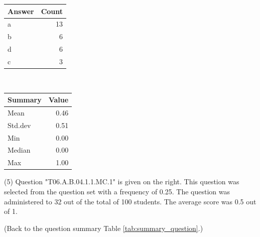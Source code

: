 \documentclass[12pt,nohyper]{tufte-handout}\usepackage[]{graphicx}\usepackage[]{color}
\begin{document}
\begin{center}%
\begin{tabular}{lr}
  \hline
Answer & Count \\ 
  \hline
a &  13 \\ 
  b &   6 \\ 
  d &   6 \\ 
  c &   3 \\ 
   \hline
\end{tabular}
~~~~~~~~%
\begin{tabular}{lr}
  \hline
Summary & Value \\ 
  \hline
Mean & 0.46 \\ 
  Std.dev & 0.51 \\ 
  Min & 0.00 \\ 
  Median & 0.00 \\ 
  Max & 1.00 \\ 
   \hline
\end{tabular}
\end{center}\newpage{} (5) Question "T06.A.B.04.1.1.MC.1" is given on the right. This question was selected from the question set with a frequency of 0.25. The question was administered to 32 out of the total of 100 students. The average score was 0.5 out of 1.

 (Back to the question summary Table \ref{tab:summary_question}.)
\end{document}

